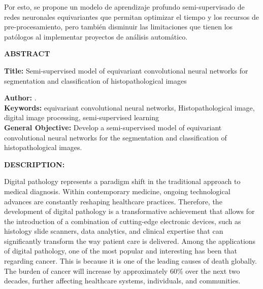 \documentclass[12pt,letterpaper,final, openany]{scrbook}
\begin{document}
Por esto, se propone un modelo de aprendizaje profundo semi-supervisado de redes neuronales equivariantes que permitan optimizar el tiempo y los recursos de pre-procesamiento, pero también disminuir las limitaciones que tienen los patólogos al implementar proyectos de análisis automático.





\newpage
{}
\begin{center}
	\Large\textbf{ABSTRACT}\\[20pt]
\end{center}
\textbf{Title:} Semi-supervised model of equivariant convolutional neural networks for segmentation and classification of histopathological images\footnotemark[1]

\vspace*{5mm}

\textbf{Author:} \Author.\footnotemark[2] \\

\textbf{Keywords:} equivariant convolutional neural networks, Histopathological image, digital image processing, semi-supervised learning \\



\textbf{General Objective:}
 Develop a semi-supervised model of equivariant convolutional neural networks for the segmentation and classification of histopathological images.


\textbf{DESCRIPTION:}

Digital pathology represents a paradigm shift in the traditional approach to medical diagnosis. Within contemporary medicine, ongoing technological advances are constantly reshaping healthcare practices. Therefore, the development of digital pathology is a transformative achievement that allows for the introduction of a combination of cutting-edge electronic devices, such as histology slide scanners, data analytics, and clinical expertise that can significantly transform the way patient care is delivered.
Among the applications of digital pathology, one of the most popular and interesting has been that regarding cancer. This is because it is one of the leading causes of death globally. The burden of cancer will increase by approximately 60\% over the next two decades, further affecting healthcare systems, individuals, and communities.
\end{document}

